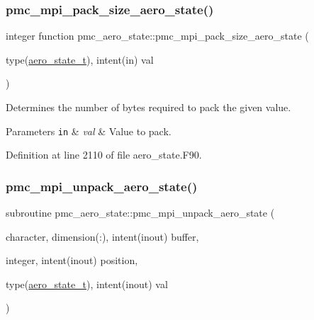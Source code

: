 \subsubsection{\texorpdfstring{pmc\+\_\+mpi\+\_\+pack\+\_\+size\+\_\+aero\+\_\+state()}{pmc\_mpi\_pack\_size\_aero\_state()}}
{\footnotesize\ttfamily integer function pmc\+\_\+aero\+\_\+state\+::pmc\+\_\+mpi\+\_\+pack\+\_\+size\+\_\+aero\+\_\+state (\begin{DoxyParamCaption}\item[{type(\mbox{\hyperlink{structpmc__aero__state_1_1aero__state__t}{aero\+\_\+state\+\_\+t}}), intent(in)}]{val }\end{DoxyParamCaption})}



Determines the number of bytes required to pack the given value. 


\begin{DoxyParams}[1]{Parameters}
\mbox{\tt in}  & {\em val} & Value to pack. \\
\hline
\end{DoxyParams}


Definition at line 2110 of file aero\+\_\+state.\+F90.

\mbox{\label{namespacepmc__aero__state_a1fbfce661ac4cf88b383e88a44e0a9b6}} 
\subsubsection{\texorpdfstring{pmc\+\_\+mpi\+\_\+unpack\+\_\+aero\+\_\+state()}{pmc\_mpi\_unpack\_aero\_state()}}
{\footnotesize\ttfamily subroutine pmc\+\_\+aero\+\_\+state\+::pmc\+\_\+mpi\+\_\+unpack\+\_\+aero\+\_\+state (\begin{DoxyParamCaption}\item[{character, dimension(\+:), intent(inout)}]{buffer,  }\item[{integer, intent(inout)}]{position,  }\item[{type(\mbox{\hyperlink{structpmc__aero__state_1_1aero__state__t}{aero\+\_\+state\+\_\+t}}), intent(inout)}]{val }\end{DoxyParamCaption})}



